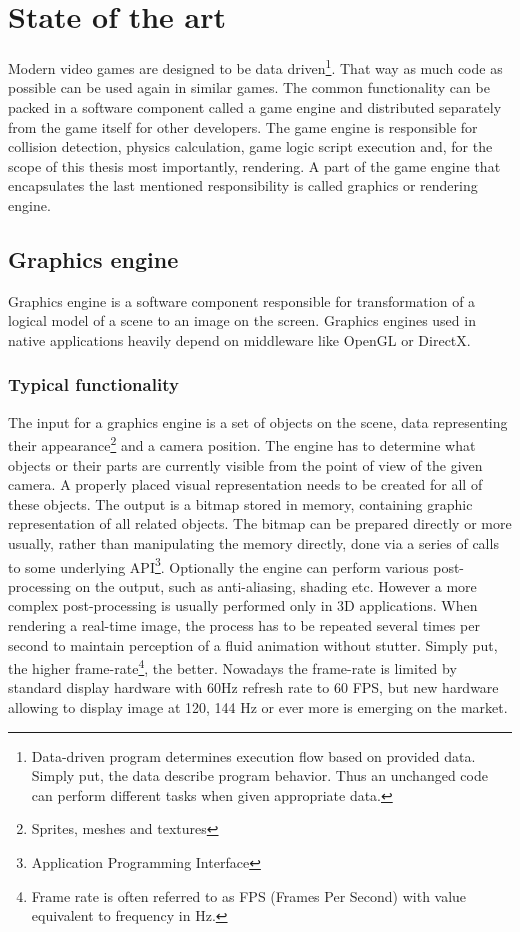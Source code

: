 \documentclass[11pt,oneside, final]{fithesis2}
\begin{document}
\chapter{State of the art}
\label{theory}

Modern video games are designed to be data driven\footnote{Data-driven program determines execution flow based on provided data. Simply put, the data describe program behavior. Thus an unchanged code can perform different tasks when given appropriate data.\cite{charniak}}. That way as much code as possible can be used again in similar games. The common functionality can be packed in a software component called a game engine\cite{gregory} and distributed separately from the game itself for other developers. The game engine is responsible for collision detection, physics calculation, game logic script execution and, for the scope of this thesis most importantly, rendering. A part of the game engine that encapsulates the last mentioned responsibility is called graphics or rendering engine.

\section{Graphics engine}
Graphics engine is a software component responsible for transformation of a logical model of a scene to an image on the screen. Graphics engines used in native applications heavily depend on middleware like OpenGL or DirectX\cite{gregory}.

\subsection{Typical functionality}
\label{enginefunctionality}
The input for a graphics engine is a set of objects on the scene, data representing their appearance\footnote{Sprites, meshes and textures} and a camera position. The engine has to determine what objects or their parts are currently visible from the point of view of the given camera. A properly placed visual representation needs to be created for all of these objects. The output is a bitmap stored in memory, containing graphic representation of all related objects. The bitmap can be prepared directly or more usually, rather than manipulating the memory directly, done via a series of calls to some underlying API\footnote{Application Programming Interface}. Optionally the engine can perform various post-processing on the output, such as anti-aliasing, shading etc.\cite{gregory} However a more complex post-processing is usually performed only in 3D applications. When rendering a real-time image, the process has to be repeated several times per second to maintain perception of a fluid animation without stutter. Simply put, the higher frame-rate\footnote{Frame rate is often referred to as FPS (Frames Per Second) with value equivalent to frequency in Hz.}, the better\cite{claypool}. Nowadays the frame-rate is limited by standard display hardware with 60Hz refresh rate to 60 FPS, but new hardware allowing to display image at 120, 144 Hz or ever more is emerging on the market.
\end{document}
